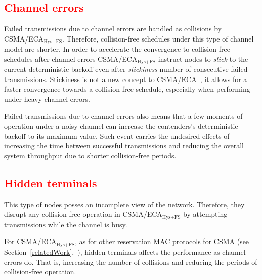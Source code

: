 %	

	\textcolor{red}{\subsection{Channel errors}}\label{errorEffect}
	Failed transmissions due to channel errors are handled as collisions by CSMA/ECA$_{\text{Hys+FS}}$. Therefore, collision-free schedules under this type of channel model are shorter. In order to accelerate the convergence to collision-free schedules after channel errors CSMA/ECA$_{\text{Hys+FS}}$ instruct nodes to \emph{stick} to the current deterministic backoff even after \emph{stickiness} number of consecutive failed transmissions. Stickiness is not a new concept to CSMA/ECA~\cite{barcelo2011tcf}, it allows for a faster convergence towards a collision-free schedule, especially when performing under heavy channel errors.
	
	Failed transmissions due to channel errors also means that a few moments of operation under a noisy channel can increase the contenders's deterministic backoff to its maximum value. Such event carries the undesired effects of increasing the time between successful transmissions and reducing the overall system throughput due to shorter collision-free periods.
		
	\textcolor{red}{\subsection{Hidden terminals}}\label{hidden}
	This type of nodes posses an incomplete view of the network. Therefore, they disrupt any collision-free operation in CSMA/ECA$_{\text{Hys+FS}}$ by attempting transmissions while the channel is busy.
	
	For CSMA/ECA$_{\text{Hys+FS}}$, as for other reservation MAC protocols for CSMA (see Section~\ref{relatedWork},~\cite{HE,L_MAC}), hidden terminals affects the performance as channel errors do. That is, increasing the number of collisions and reducing the periods of collision-free operation.
		
